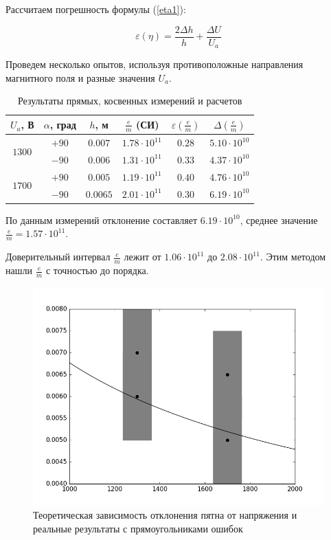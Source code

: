 Рассчитаем погрешность формулы (\ref{eta1}):

\begin{equation}
	\varepsilon{(\eta)}=\frac{2\Delta{h}}{h}+\frac{\Delta{U}}{U_a}
\end{equation}

Проведем несколько опытов, используя противоположные направления магнитного поля и разные значения $U_a$.

\begin{table}[h]
\begin{center}
\begin{tabular}{|c|c|c|c|c|c|}

\hline
$U_a$, В & $\alpha$, град & $h$, м & $\frac{e}{m}$ (СИ) & $\varepsilon{(\frac{e}{m})}$ & $\Delta{(\frac{e}{m})}$\\
\hline
\multirow{2}{*}{$1300$} & $+90$ & $0.007$ & $1.78\cdot10^{11}$ & $0.28$ & $5.10\cdot10^{10}$ \\ 

\cline{2-6}
						& $-90$ & $0.006$ & $1.31\cdot10^{11}$ & $0.33$ & $4.37\cdot10^{10}$ \\ \hline
\multirow{2}{*}{$1700$} & $+90$ & $0.005$ & $1.19\cdot10^{11}$ & $0.40$ & $4.76\cdot10^{10}$ \\
\cline{2-6}
						& $-90$ &$0.0065$ & $2.01\cdot10^{11}$ & $0.30$ & $6.19\cdot10^{10}$ \\ \hline

\end{tabular}
\end{center}
\caption{\label{tab:ex_1}Результаты прямых, косвенных измерений и расчетов}
\end{table} 

По данным измерений отклонение составляет $6.19\cdot10^{10}$, среднее значение $\frac{e}{m}=1.57\cdot10^{11}$.

Доверительный интервал $\frac{e}{m}$ лежит от $1.06\cdot10^{11}$ до $2.08\cdot10^{11}$. Этим методом нашли $\frac{e}{m}$ с точностью до порядка.

\begin{figure}[ht!]
	\centering
	\includegraphics[width=\textwidth]{img/figure_1.png}
	\caption{Теоретическая зависимость отклонения пятна от напряжения и реальные результаты с прямоугольниками ошибок}
	\label{fig:figure1}
\end{figure}


